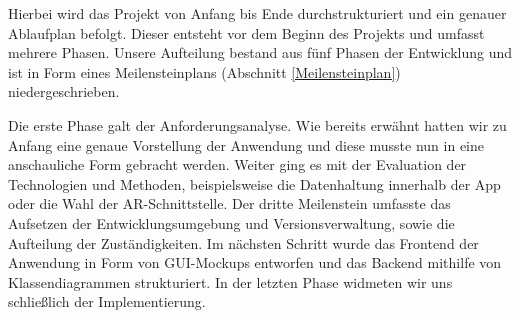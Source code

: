 Hierbei wird das Projekt von Anfang bis Ende durchstrukturiert und ein genauer Ablaufplan befolgt.
Dieser entsteht vor dem Beginn des Projekts und umfasst mehrere Phasen. 
Unsere Aufteilung bestand aus fünf Phasen der Entwicklung und ist in Form eines Meilensteinplans (Abschnitt \ref{Meilensteinplan}) niedergeschrieben. 

Die erste Phase galt der Anforderungsanalyse. 
Wie bereits erwähnt hatten wir zu Anfang eine genaue Vorstellung der Anwendung und diese musste nun in eine anschauliche Form gebracht werden. 
Weiter ging es mit der Evaluation der Technologien und Methoden, beispielsweise die Datenhaltung innerhalb der App oder die Wahl der AR-Schnittstelle.
Der dritte Meilenstein umfasste das Aufsetzen der Entwicklungsumgebung und Versionsverwaltung, sowie die Aufteilung der Zuständigkeiten.
Im nächsten Schritt wurde das Frontend der Anwendung in Form von GUI-Mockups entworfen und das Backend mithilfe von Klassendiagrammen strukturiert.
In der letzten Phase widmeten wir uns schließlich der Implementierung.
